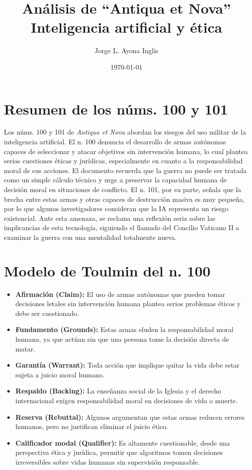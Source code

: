 \documentclass[12pt]{article}
\title{Análisis de ``Antiqua et Nova''\\ Inteligencia artificial y ética}
\author{Jorge L. Ayona Inglis}
\date{\today}
\begin{document}
\maketitle

\section*{Resumen de los núms. 100 y 101}

Los núms. 100 y 101 de \textit{Antiqua et Nova} abordan los riesgos del uso militar de la inteligencia artificial. El n. 100 denuncia el desarrollo de armas autónomas capaces de seleccionar y atacar objetivos sin intervención humana, lo cual plantea serias cuestiones éticas y jurídicas, especialmente en cuanto a la responsabilidad moral de sus acciones. El documento recuerda que la guerra no puede ser tratada como un simple cálculo técnico y urge a preservar la capacidad humana de decisión moral en situaciones de conflicto. El n. 101, por su parte, señala que la brecha entre estas armas y otras capaces de destrucción masiva es muy pequeña, por lo que algunos investigadores consideran que la IA representa un riesgo existencial. Ante esta amenaza, se reclama una reflexión seria sobre las implicancias de esta tecnología, siguiendo el llamado del Concilio Vaticano II a examinar la guerra con una mentalidad totalmente nueva.

\section*{Modelo de Toulmin del n. 100}

\begin{itemize}[leftmargin=2em]
  \item \textbf{Afirmación (Claim):} El uso de armas autónomas que pueden tomar decisiones letales sin intervención humana plantea serios problemas éticos y debe ser cuestionado.
  \item \textbf{Fundamento (Grounds):} Estas armas eluden la responsabilidad moral humana, ya que actúan sin que una persona tome la decisión directa de matar.
  \item \textbf{Garantía (Warrant):} Toda acción que implique quitar la vida debe estar sujeta a juicio moral humano.
  \item \textbf{Respaldo (Backing):} La enseñanza social de la Iglesia y el derecho internacional exigen responsabilidad moral en decisiones de vida o muerte.
  \item \textbf{Reserva (Rebuttal):} Algunos argumentan que estas armas reducen errores humanos, pero no justifican eliminar el juicio ético.
  \item \textbf{Calificador modal (Qualifier):} Es altamente cuestionable, desde una perspectiva ética y jurídica, permitir que algoritmos tomen decisiones irreversibles sobre vidas humanas sin supervisión responsable.
\end{itemize}
\end{document}
